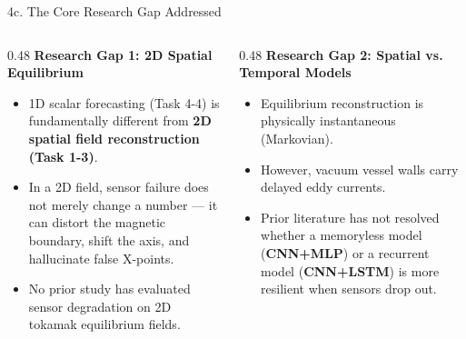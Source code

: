 \documentclass[aspectratio=169, 10pt]{beamer}
\begin{document}
\begin{frame}{4c. The Core Research Gap Addressed}
  \begin{columns}[T]
    \begin{column}{0.48\textwidth}
      \textbf{\color{NavyBlue} Research Gap 1: 2D Spatial Equilibrium}
      \begin{itemize}
        \item 1D scalar forecasting (Task 4-4) is fundamentally different from \textbf{2D spatial field reconstruction (Task 1-3)}.
        \item In a 2D field, sensor failure does not merely change a number --- it can distort the magnetic boundary, shift the axis, and hallucinate false X-points.
        \item No prior study has evaluated sensor degradation on 2D tokamak equilibrium fields.
      \end{itemize}
    \end{column}

    \begin{column}{0.48\textwidth}
      \textbf{\color{NavyBlue} Research Gap 2: Spatial vs. Temporal Models}
      \begin{itemize}
        \item Equilibrium reconstruction is physically instantaneous (Markovian).
        \item However, vacuum vessel walls carry delayed eddy currents.
        \item Prior literature has not resolved whether a memoryless model (\textbf{CNN+MLP}) or a recurrent model (\textbf{CNN+LSTM}) is more resilient when sensors drop out.
      \end{itemize}
    \end{column}
  \end{columns}
\end{frame}
\end{document}
